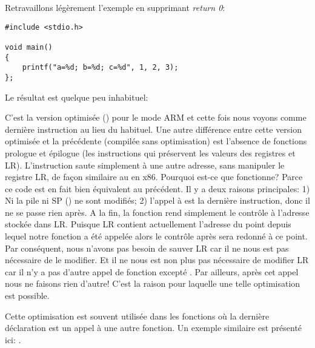 \label{ARM_B_to_printf}

Retravaillons légèrement l'exemple en supprimant \emph{return 0}:

\begin{lstlisting}[style=customc]
#include <stdio.h>

void main()
{
	printf("a=%d; b=%d; c=%d", 1, 2, 3);
};
\end{lstlisting}

Le résultat est quelque peu inhabituel:



C'est la version optimisée (\Othree) pour le mode ARM et cette fois nous voyons
 comme dernière instruction au lieu du  habituel.
Une autre différence entre cette version optimisée et la précédente (compilée
sans optimisation) est l'absence de fonctions prologue et épilogue (les instructions
qui préservent les valeurs des registres  et \ac{LR}).
L'instruction  saute simplement à une autre adresse, sans manipuler le registre
\ac{LR}, de façon similaire au \JMP en x86.
Pourquoi est-ce que fonctionne? Parce ce code est en fait bien équivalent au précédent.
Il y a deux raisons principales: 1) Ni la pile ni \ac{SP} ()
ne sont modifiés;
2) l'appel à \printf est la dernière instruction, donc il ne se passe rien après.
A la fin, la fonction \printf rend simplement le contrôle à l'adresse stockée
dans \ac{LR}.
Puisque \ac{LR} contient actuellement l'adresse du point depuis lequel notre fonction
a été appelée alors le contrôle après \printf sera redonné à ce point.
Par conséquent, nous n'avons pas besoin de sauver \ac{LR} car il ne nous est pas
nécessaire de le modifier.
Et il ne nous est non plus pas nécessaire de modifier \ac{LR} car il n'y a pas d'autre
appel de fonction excepté \printf. Par ailleurs, après cet appel nous ne faisons
rien d'autre!
C'est la raison pour laquelle une telle optimisation est possible.

Cette optimisation est souvent utilisée dans les fonctions où la dernière déclaration
est un appel à une autre fonction.
Un exemple similaire est présenté ici:
.


